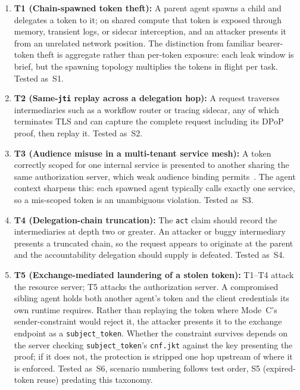 \documentclass[conference]{IEEEtran}
\begin{document}
\begin{enumerate}
\item \textbf{T1 (Chain-spawned token theft):} A parent agent spawns a child and delegates a token to it; on shared compute that token is exposed through memory, transient logs, or sidecar interception, and an attacker presents it from an unrelated network position. The distinction from familiar bearer-token theft is aggregate rather than per-token exposure: each leak window is brief, but the spawning topology multiplies the tokens in flight per task. Tested as~S1.

\item \textbf{T2 (Same-\texttt{jti} replay across a delegation hop):} A request traverses intermediaries such as a workflow router or tracing sidecar, any of which terminates TLS and can capture the complete request including its DPoP proof, then replay it. Tested as~S2.

\item \textbf{T3 (Audience misuse in a multi-tenant service mesh):} A token correctly scoped for one internal service is presented to another sharing the same authorization server, which weak audience binding permits~\cite{li2022capability,yang2023k8sperm}. The agent context sharpens this: each spawned agent typically calls exactly one service, so a mis-scoped token is an unambiguous violation. Tested as~S3.

\item \textbf{T4 (Delegation-chain truncation):} The \texttt{act} claim should record the intermediaries at depth two or greater. An attacker or buggy intermediary presents a truncated chain, so the request appears to originate at the parent and the accountability delegation should supply is defeated. Tested as~S4.

\item \textbf{T5 (Exchange-mediated laundering of a stolen token):} T1--T4 attack the resource server; T5 attacks the authorization server. A compromised sibling agent holds both another agent's token and the client credentials its own runtime requires. Rather than replaying the token where Mode~C's sender-constraint would reject it, the attacker presents it to the exchange endpoint as a \texttt{subject\_token}. Whether the constraint survives depends on the server checking \texttt{subject\_token}'s \texttt{cnf.jkt} against the key presenting the proof; if it does not, the protection is stripped one hop upstream of where it is enforced. Tested as~S6, scenario numbering follows test order, S5 (expired-token reuse) predating this taxonomy.
\end{enumerate}
\end{document}
